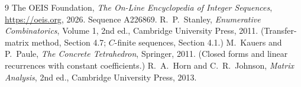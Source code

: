 \documentclass[11pt,a4paper]{article}
\theoremstyle{plain}
\theoremstyle{definition}
\begin{document}
\begin{thebibliography}{9}
 The OEIS Foundation, \emph{The On-Line Encyclopedia of Integer
Sequences}, \url{https://oeis.org}, 2026. Sequence A226869.
 R.~P.~Stanley, \emph{Enumerative Combinatorics}, Volume 1, 2nd ed.,
Cambridge University Press, 2011. (Transfer-matrix method, Section 4.7; $C$-finite sequences,
Section 4.1.)
 M.~Kauers and P.~Paule, \emph{The Concrete Tetrahedron}, Springer, 2011.
(Closed forms and linear recurrences with constant coefficients.)
 R.~A.~Horn and C.~R.~Johnson, \emph{Matrix Analysis}, 2nd ed., Cambridge
University Press, 2013.
\end{thebibliography}
\end{document}
